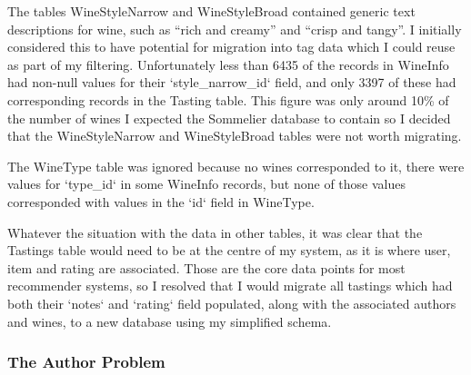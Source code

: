 The tables WineStyleNarrow and WineStyleBroad contained generic text descriptions for wine, such as ``rich and creamy'' and ``crisp and tangy''. I initially considered this to have potential for migration into tag data which I could reuse as part of my filtering. Unfortunately less than 6435 of the records in WineInfo had non-null values for their `style\_narrow\_id` field, and only 3397 of these had corresponding records in the Tasting table. This figure was only around 10\% of the number of wines I expected the Sommelier database to contain so I decided that the WineStyleNarrow and WineStyleBroad tables were not worth migrating.

The WineType table was ignored because no wines corresponded to it, there were values for `type\_id` in some WineInfo records, but none of those values corresponded with values in the `id` field in WineType.

Whatever the situation with the data in other tables, it was clear that the Tastings table would need to be at the centre of my system, as it is where user, item and rating are associated. Those are the core data points for most recommender systems, so I resolved that I would migrate all tastings which had both their `notes` and `rating` field populated, along with the associated authors and wines, to a new database using my simplified schema.

\subsubsection{The Author Problem}

